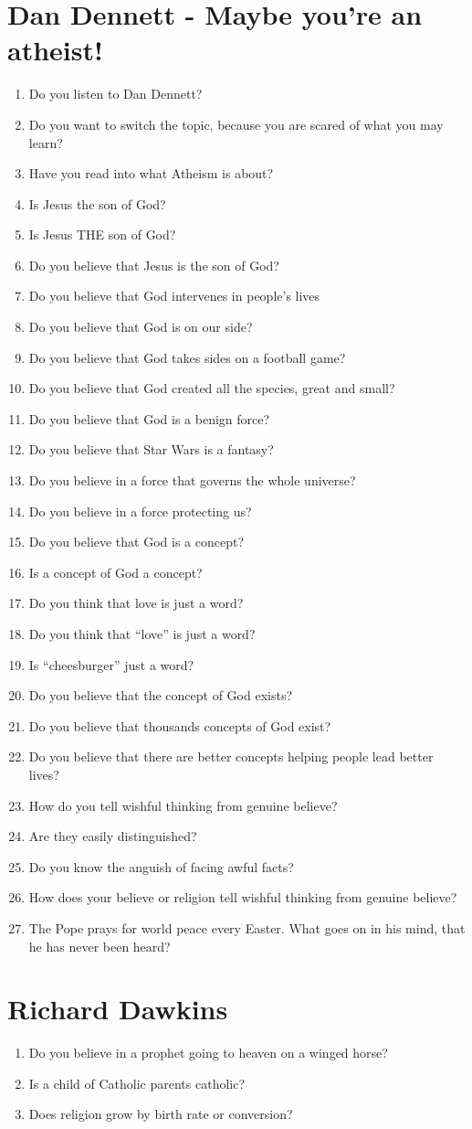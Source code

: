 \documentclass[10pt,a4paper]{article}
\begin{document}
\section{Dan Dennett - Maybe you're an atheist!}
\begin{enumerate}
	\item Do you listen to Dan Dennett?
	\item Do you want to switch the topic, because you are scared of what you may learn?
	\item Have you read into what Atheism is about?
	\item Is Jesus the son of God?
	\item Is Jesus THE son of God?
	\item Do you believe that Jesus is the son of God?
	\item Do you believe that God intervenes in people's lives
	\item Do you believe that God is on our side? 
	\item Do you believe that God takes sides on a football game?
	\item Do you believe that God created all the species, great and small?
	\item Do you believe that God is a benign force?
	\item Do you believe that Star Wars is a fantasy?
	\item Do you believe in a force that governs the whole universe?
	\item Do you believe in a force protecting us?
	\item Do you believe that God is a concept?
	\item Is a concept of God a concept?
	\item Do you think that love is just a word?
	\item Do you think that \enquote{love} is just a word?
	\item Is \enquote{cheesburger} just a word?
	\item Do you believe that the concept of God exists?
	\item Do you believe that thousands concepts of God exist?
	\item Do you believe that there are better concepts helping people lead better lives?
	\item How do you tell wishful thinking from genuine believe?
	\item Are they easily distinguished?
	\item Do you know the anguish of facing awful facts?
	\item How does your believe or religion tell wishful thinking from genuine believe?
	\item The Pope prays for world peace every Easter. What goes on in his mind, that he has never been heard?
\end{enumerate}

\clearpage
\section{Richard Dawkins}
\begin{enumerate}
	\item Do you believe in a prophet going to heaven on a winged horse?
	\item Is a child of Catholic parents catholic?
	\item Does religion grow by birth rate or conversion?
\end{enumerate}
\end{document}
